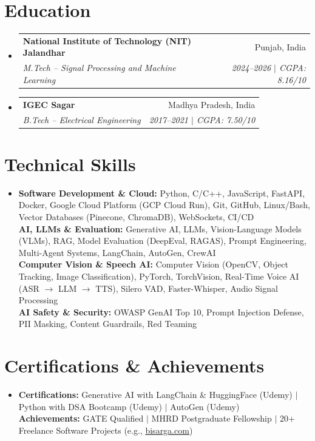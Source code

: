 \documentclass[letterpaper,10pt]{article}
\makeatletter
\newcommand{\resumeSubheading}[4]{
  \vspace{-2pt}\item
    \begin{tabular*}{0.97\textwidth}[t]{l@{\extracolsep{\fill}}r}
      \textbf{#1} & #2 \\
      \textit{\small#3} & \textit{\small #4} \\
    \end{tabular*}\vspace{-7pt}
}
\newcommand{\resumeSubHeadingListStart}{\begin{itemize}[leftmargin=0.15in, label={}]}
\newcommand{\resumeSubHeadingListEnd}{\end{itemize}}
\makeatother
\begin{document}
\section{Education}
\resumeSubHeadingListStart
\resumeSubheading{National Institute of Technology (NIT) Jalandhar}{Punjab, India}{M.Tech -- Signal Processing and Machine Learning}{2024--2026 $|$ CGPA: 8.16/10}
\resumeSubheading{IGEC Sagar}{Madhya Pradesh, India}{B.Tech -- Electrical Engineering}{2017--2021 $|$ CGPA: 7.50/10}
\resumeSubHeadingListEnd

\section{Technical Skills}
\begin{itemize}[leftmargin=0.15in,label={}]
\small\item{
\textbf{Software Development \& Cloud:} Python, C/C++, JavaScript, FastAPI, Docker, Google Cloud Platform (GCP Cloud Run), Git, GitHub, Linux/Bash, Vector Databases (Pinecone, ChromaDB), WebSockets, CI/CD\\[2pt]
\textbf{AI, LLMs \& Evaluation:} Generative AI, LLMs, Vision-Language Models (VLMs), RAG, Model Evaluation (DeepEval, RAGAS), Prompt Engineering, Multi-Agent Systems, LangChain, AutoGen, CrewAI\\[2pt]
\textbf{Computer Vision \& Speech AI:} Computer Vision (OpenCV, Object Tracking, Image Classification), PyTorch, TorchVision, Real-Time Voice AI (ASR $\rightarrow$ LLM $\rightarrow$ TTS), Silero VAD, Faster-Whisper, Audio Signal Processing\\[2pt]
\textbf{AI Safety \& Security:} OWASP GenAI Top 10, Prompt Injection Defense, PII Masking, Content Guardrails, Red Teaming
}
\end{itemize}

\section{Certifications \& Achievements}
\begin{itemize}[leftmargin=0.15in,label={}]
\small\item{
\textbf{Certifications:} Generative AI with LangChain \& HuggingFace (Udemy) $|$ Python with DSA Bootcamp (Udemy) $|$ AutoGen (Udemy)\\
\textbf{Achievements:} GATE Qualified $|$ MHRD Postgraduate Fellowship $|$ 20+ Freelance Software Projects (e.g., \href{https://bisarga.com}{\underline{bisarga.com}})
}
\end{itemize}
\end{document}
